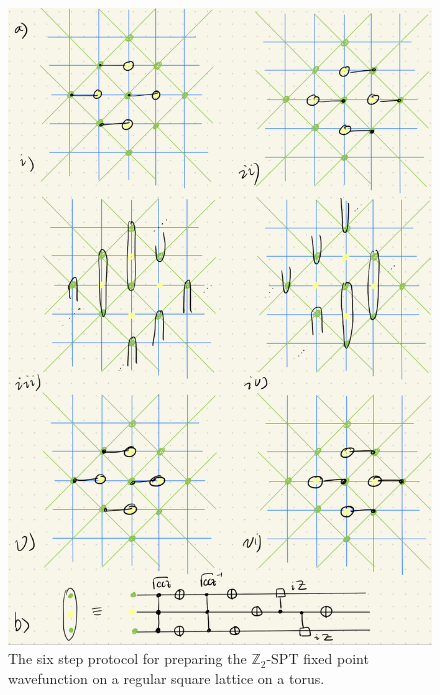 \documentclass[a4paper,twocolumn,11pt]{quantumarticle}
\begin{document}
\begin{figure}
\centering
\includegraphics[width=\linewidth]{Figures/torus_protocol.png}
\caption{The six step protocol for preparing the $\mathbb{Z}_2$-SPT fixed point wavefunction on a regular square lattice on a torus.}
\label{fig:prot}
\end{figure}
\end{document}

